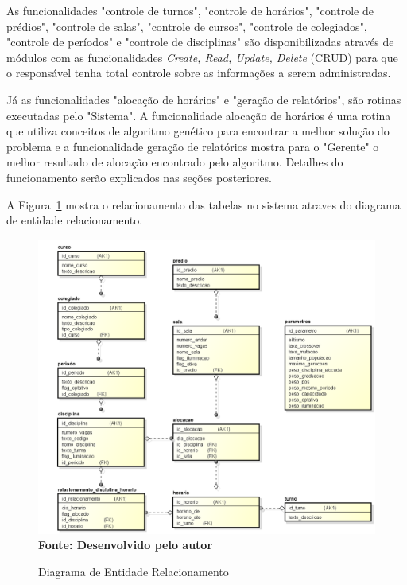 As funcionalidades "controle de turnos", "controle de horários", "controle de prédios", "controle de salas", "controle de cursos", "controle de colegiados", "controle de períodos" e "controle de disciplinas" são disponibilizadas através de módulos com as funcionalidades \textit{Create, Read, Update, Delete} (CRUD) para que o responsável tenha total controle sobre as informações a serem administradas.\par

Já as funcionalidades "alocação de horários" e "geração de relatórios", são rotinas executadas pelo "Sistema". A funcionalidade alocação de horários é uma rotina que utiliza conceitos de algoritmo genético para encontrar a melhor solução do problema e a funcionalidade geração de relatórios mostra para o "Gerente" o melhor resultado de alocação encontrado pelo algoritmo. Detalhes do funcionamento serão explicados nas seções posteriores.\par


A Figura~\ref{fig:der} mostra o relacionamento das tabelas no sistema atraves do diagrama de entidade relacionamento.\par

\begin{figure}[!htb]
\caption[Diagrama de Entidade Relacionamento]{Diagrama de Entidade Relacionamento}
\label{fig:der}
\centering
\includegraphics[scale=0.5]{imagens/diagramaEntidadeRelacionamento.png}
\\ \textbf{\footnotesize Fonte: Desenvolvido pelo autor}
\end{figure}

